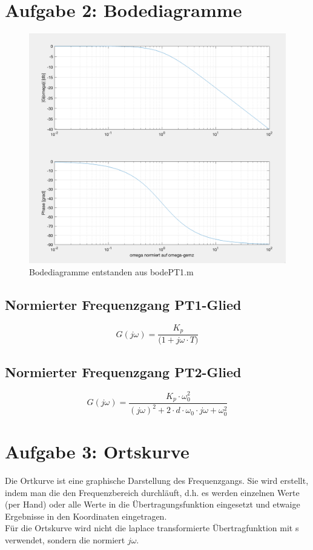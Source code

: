 \documentclass{article}
\begin{document}
	\section{Aufgabe 2: Bodediagramme}
		\begin{figure}[h]
 		 	\includegraphics[scale=0.3]{./Bodediagramme.png}
			\caption{Bodediagramme entstanden aus bodePT1.m}
			\label{fig1: Bodediagramm1}
		\end{figure}
		
		
		\subsection{Normierter Frequenzgang PT1-Glied}
			$$G(j\omega) = \frac{K_p}{\Big(1 + j\omega \cdot T\Big)}$$
		\subsection{Normierter Frequenzgang PT2-Glied}
			$$G(j\omega) = \frac{K_p \cdot \omega_0^2}{(j\omega)^2 + 2\cdot d\cdot \omega_0 \cdot j\omega + \omega_0^2}$$
	\newpage	
	\section{Aufgabe 3: Ortskurve}
		Die Ortkurve ist eine graphische Darstellung des Frequenzgangs. Sie wird erstellt, indem man die den Frequenzbereich durchläuft, d.h. es werden einzelnen Werte (per Hand) oder alle Werte in die Übertragungsfunktion eingesetzt und etwaige Ergebnisse in den Koordinaten eingetragen.\\
		Für die Ortskurve wird nicht die laplace transformierte Übertragfunktion mit s verwendet, sondern die normiert $j\omega$.
	
\end{document}
